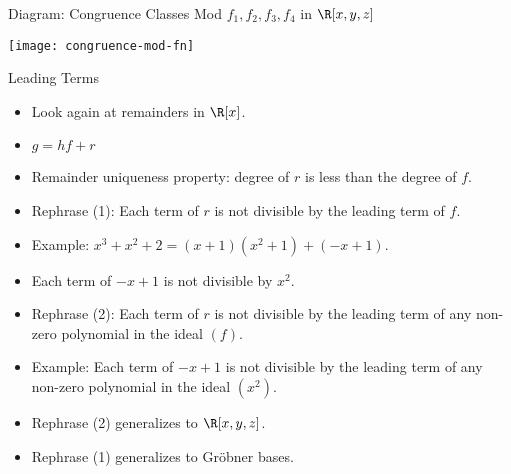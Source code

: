 \documentclass[handout]{beamer}
\begin{document}

\begin{frame}{Diagram: Congruence Classes Mod $f_1,f_2,f_3,f_4$ in $\R[x,y,z]$}

\begin{center}
\texttt{[image: congruence-mod-fn]}
\end{center}

\end{frame}



\begin{frame}{Leading Terms}

\begin{itemize}
  \item Look again at remainders in $\R[x]$.
  \item $g=hf + r$
  \item Remainder uniqueness property: degree of $r$ is less than the degree of $f$.
  \item Rephrase (1): Each term of $r$ is not divisible by the leading term of $f$.
  \item Example: $x^3 + x^2 + 2 = (x+1)(x^2+1) + ( -x + 1)$.
  \item Each term of $-x+1$ is not divisible by $x^2$.
  \item Rephrase (2): Each term of $r$ is not divisible by the leading term of any non-zero polynomial in the ideal $(f)$.
  \item Example: Each term of $-x+1$ is not divisible by the leading term of any non-zero polynomial in the ideal $(x^2)$.
  \item Rephrase (2) generalizes to $\R[x,y,z]$.
  \item Rephrase (1) generalizes to Gr\"{o}bner bases.
\end{itemize}

\end{frame}
\end{document}
